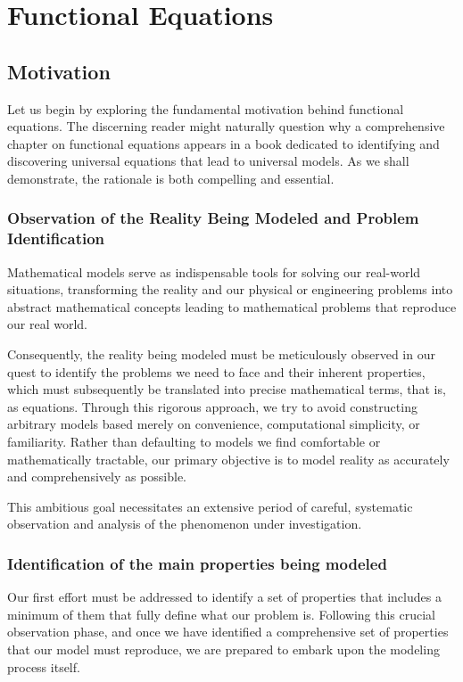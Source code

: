 \chapter{Functional Equations}

\section{Motivation}
Let us begin by exploring the fundamental motivation behind functional equations. The discerning reader might naturally question why a comprehensive chapter on functional equations appears in a book dedicated to identifying and discovering universal equations that lead to universal models. As we shall demonstrate, the rationale is both compelling and essential.

\subsection{Observation of the Reality Being Modeled and Problem Identification}
Mathematical models serve as indispensable tools for solving our real-world situations, transforming the reality and our physical or engineering problems into abstract mathematical concepts leading to mathematical problems that reproduce our real world.

Consequently, the reality being modeled must be meticulously observed in our quest to identify the problems we need to face and their inherent properties, which must subsequently be translated into precise mathematical terms, that is, as equations. Through this rigorous approach, we try to avoid constructing arbitrary models based merely on convenience, computational simplicity, or familiarity. Rather than defaulting to models we find comfortable or mathematically tractable, our primary objective is to model reality as accurately and comprehensively as possible.

This ambitious goal necessitates an extensive period of careful, systematic observation and analysis of the phenomenon under investigation.

\subsection{Identification of the main properties being modeled}
Our first effort must be addressed to identify a set of properties that includes a minimum of them that fully define what our problem is.
Following this crucial observation phase, and once we have identified a comprehensive set of properties that our model must reproduce, we are prepared to embark upon the modeling process itself.

